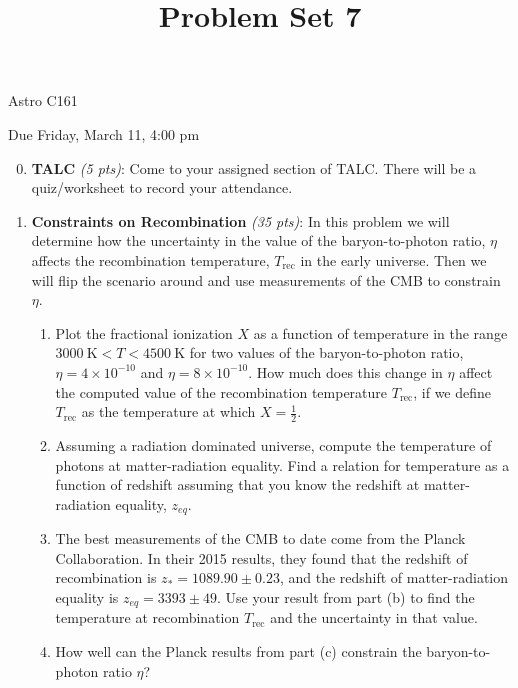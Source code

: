 \documentclass[12pt,preprint]{aastex}
\title{Problem Set 7}
\def\K{\mathrm{K}}
\newcommand\sn[2]{#1 \times 10^{#2}}
\def\half{\frac{1}{2}}
\def\Trec{T_{\mathrm{rec}}}
\begin{document}
\maketitle
\centerline{Astro C161} 

\centerline{Due Friday, March 11, 4:00 pm}

\begin{enumerate}
\setcounter{enumi}{-1}

\item \textbf{TALC} \textit{(5 pts)}: Come to your assigned section of TALC. There will be a quiz/worksheet to record your attendance.

\item \textbf{Constraints on Recombination} \textit{(35 pts)}: In this problem we will determine how the uncertainty in the value of the baryon-to-photon ratio, $\eta$ affects the recombination temperature, $\Trec$ in the early universe. Then we will flip the scenario around and use measurements of the CMB to constrain $\eta$. 
	\begin{enumerate}
	\item Plot the fractional ionization $X$ as a function of temperature in the range $3000\ \K < T < 4500\ \K$ for two values of the baryon-to-photon ratio, $\eta = \sn{4}{-10}$ and $\eta = \sn{8}{-10}$. How much does this change in $\eta$ affect the computed value of the recombination temperature $\Trec$, if we define $\Trec$ as the temperature at which $X = \half$. 
	\item Assuming a radiation dominated universe, compute the temperature of photons at matter-radiation equality. Find a relation for temperature as a function of redshift assuming that you know the redshift at matter-radiation equality, $z_{eq}$. 
	\item The best measurements of the CMB to date come from the Planck Collaboration. In their 2015 results, they found that the redshift of recombination is $z_* = 1089.90 \pm 0.23$, and the redshift of matter-radiation equality is $z_{eq} =  3393 \pm 49$. Use your result from part (b) to find the temperature at recombination $\Trec$ and the uncertainty in that value. 
	\item How well can the Planck results from part (c) constrain the baryon-to-photon ratio $\eta$?
	\end{enumerate}


\end{enumerate}
\end{document}
